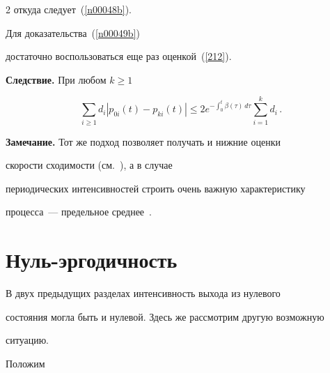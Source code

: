\begin{multicols}{2}
откуда следует~(\ref{n00048b}). 





Для доказательства~(\ref{n00049b}) 


достаточно воспользоваться еще раз оценкой~(\ref{212}).





\bigskip





\noindent


{\bf Следствие.} При любом $k \ge 1$


\begin{equation*} 


\sum_{i \ge 1} d_i \left|p_{0i}(t) - p_{ki}(t)\right|


\le 2e^{-\int_0^t \beta (\tau)\, d\tau}  \sum_{i=1}^{k} d_i\,.




\end{equation*}





\bigskip





{\bf Замечание.} Тот же подход позволяет получать и нижние оценки


скорости сходимости (см.~\cite{z07, z95, z08}), а в случае


периодических интенсивностей строить очень важную характеристику


процесса~--- предельное среднее~\cite{z06, z08}.





\section{Нуль-эргодичность}





В двух предыдущих разделах интенсивность выхода из нулевого


состояния могла быть и нулевой. Здесь же рассмотрим другую возможную


ситуацию.





Положим 


\begin{align*} 



\end{align*}
\end{multicols}
